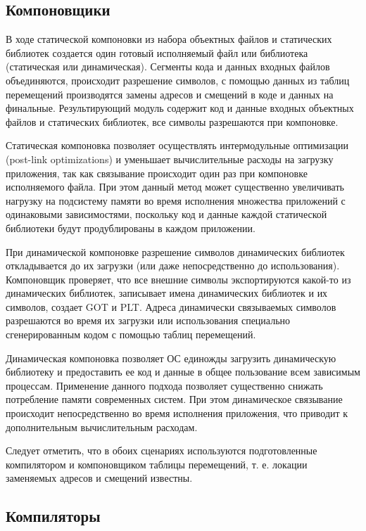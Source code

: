 \subsection{Компоновщики}

В ходе статической компоновки \cite{linkers_and_loaders} из набора объектных файлов и статических библиотек создается один готовый исполняемый файл или библиотека (статическая или динамическая). Сегменты кода и данных входных файлов объединяются, происходит разрешение символов, с помощью данных из таблиц перемещений производятся замены адресов и смещений в коде и данных на финальные. Результирующий модуль содержит код и данные входных объектных файлов и статических библиотек, все символы разрешаются при компоновке.

Статическая компоновка позволяет осуществлять интермодульные оптимизации (post-link optimizations) и уменьшает вычислительные расходы на загрузку приложения, так как связывание происходит один раз при компоновке исполняемого файла. При этом данный метод может существенно увеличивать нагрузку на подсистему памяти во время исполнения множества приложений с одинаковыми зависимостями, поскольку код и данные каждой статической библиотеки будут продублированы в каждом приложении.

При динамической компоновке \cite{linkers_and_loaders,elf_specification} разрешение символов динамических библиотек откладывается до их загрузки (или даже непосредственно до использования). Компоновщик проверяет, что все внешние символы экспортируются какой-то из динамических библиотек, записывает имена динамических библиотек и их символов, создает GOT и PLT. Адреса динамически связываемых символов разрешаются во время их загрузки или использования специально сгенерированным кодом с помощью таблиц перемещений.

Динамическая компоновка позволяет ОС единожды загрузить динамическую библиотеку и предоставить ее код и данные в общее пользование всем зависимым процессам. Применение данного подхода позволяет существенно снижать потребление памяти современных систем. При этом динамическое связывание происходит непосредственно во время исполнения приложения, что приводит к дополнительным вычислительным расходам.

Следует отметить, что в обоих сценариях используются подготовленные компилятором и компоновщиком таблицы перемещений, т. е. локации заменяемых адресов и смещений известны.

\subsection{Компиляторы}

